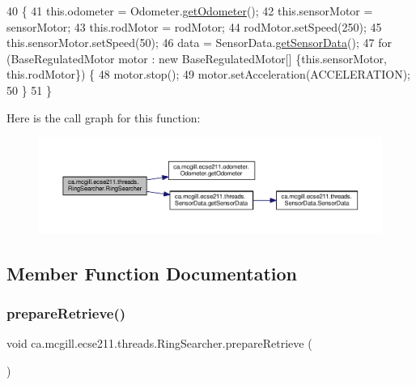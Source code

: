 \begin{DoxyCode}
40                                 \{
41     this.odometer = Odometer.\hyperlink{classca_1_1mcgill_1_1ecse211_1_1odometer_1_1_odometer_a99171f11e34dea918fa9dd069d721439}{getOdometer}();
42     this.sensorMotor = sensorMotor;
43     this.rodMotor = rodMotor;
44     rodMotor.setSpeed(250);
45     this.sensorMotor.setSpeed(50);
46     data = SensorData.\hyperlink{classca_1_1mcgill_1_1ecse211_1_1threads_1_1_sensor_data_a8260aba53b4474ca1275e4ce26157977}{getSensorData}();
47     \textcolor{keywordflow}{for} (BaseRegulatedMotor motor : \textcolor{keyword}{new} BaseRegulatedMotor[] \{this.sensorMotor, this.rodMotor\}) \{
48       motor.stop();
49       motor.setAcceleration(ACCELERATION);
50     \}
51   \}
\end{DoxyCode}
Here is the call graph for this function\+:\nopagebreak
\begin{figure}[H]
\begin{center}
\leavevmode
\includegraphics[width=350pt]{classca_1_1mcgill_1_1ecse211_1_1threads_1_1_ring_searcher_af36dd15db12c915245199bef646137ed_cgraph}
\end{center}
\end{figure}


\subsection{Member Function Documentation}
\mbox{\label{classca_1_1mcgill_1_1ecse211_1_1threads_1_1_ring_searcher_a6cbee26320e250b07e4f4b14f60d39a0}} 
\subsubsection{\texorpdfstring{prepare\+Retrieve()}{prepareRetrieve()}}
{\footnotesize\ttfamily void ca.\+mcgill.\+ecse211.\+threads.\+Ring\+Searcher.\+prepare\+Retrieve (\begin{DoxyParamCaption}{ }\end{DoxyParamCaption})}

